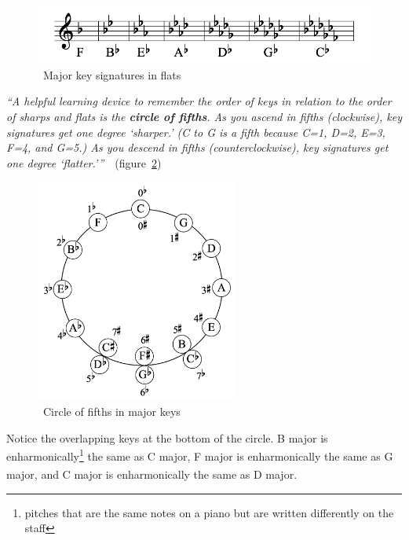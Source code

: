 \begin{figure}
    \centering
    \includegraphics[width=\textwidth]{assets/major-signatures-flats}
    \caption{~Major key signatures in flats~\cite{music-theory}}\label{fig:major-signatures-flats}
\end{figure}

\textit{``A helpful learning device to remember the order of keys in relation to the order of sharps and flats is the \textbf{circle of fifths}.
As you ascend in fifths (clockwise), key signatures get one degree `sharper.'
    (C to G is a fifth because C=1, D=2, E=3, F=4, and G=5.)
    As you descend in fifths (counterclockwise), key signatures get one degree `flatter.'{''}}~\cite{music-theory}~(figure~\ref{fig:circle-of-fifths})


\begin{figure}
    \centering
    \includegraphics[width=0.6\textwidth]{assets/circle-of-fifths}
    \caption{~Circle of fifths in major keys~\cite{music-theory}}\label{fig:circle-of-fifths}
\end{figure}

Notice the overlapping keys at the bottom of the circle.
B major is enharmonically\footnote{pitches that are the same notes on a piano but are written differently on the staff} the same as C\textsuperscript{\fl} major, F\textsuperscript{\sh} major is enharmonically the same as G\textsuperscript{\fl} major, and C\textsuperscript{\sh} major is enharmonically the same as D\textsuperscript{\fl} major.~\cite{music-theory}


